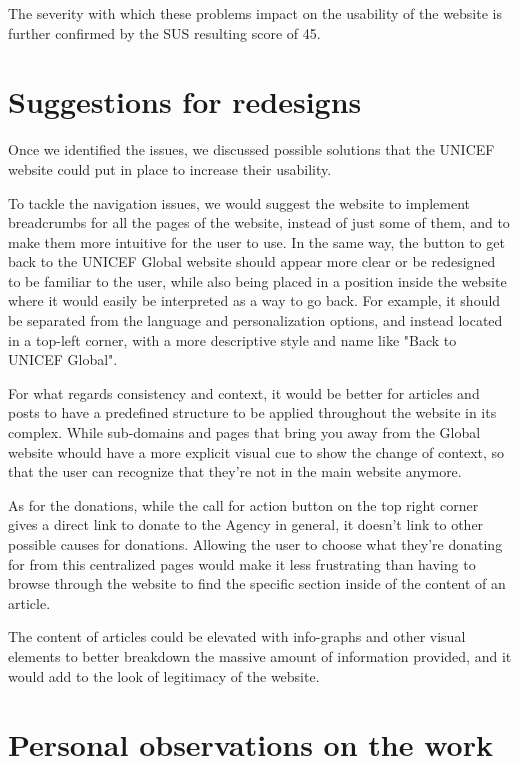 The severity with which these problems impact on the usability of the website is further confirmed by the SUS resulting score of 45.

\section{Suggestions for redesigns}
Once we identified the issues, we discussed possible solutions that the UNICEF website could put in place to increase their usability.

To tackle the navigation issues, we would suggest the website to implement breadcrumbs for all the pages of the website, instead of just some of them, and to make them more intuitive for the user to use. In the same way, the button to get back to the UNICEF Global website should appear more clear or 
be redesigned to be familiar to the user, while also being placed in a position inside the website where it would easily be interpreted as a way to go back. For example, it should be separated from the language and personalization options, and instead located in a top-left corner, with a more descriptive style and name like "Back to UNICEF Global".

For what regards consistency and context, it would be better for articles and posts to have a predefined structure to be applied throughout the website in its complex. While sub-domains and pages that bring you away from the Global website whould have a more explicit visual cue to show the change of context, so that the user can recognize that they're not in the main website anymore.

As for the donations, while the call for action button on the top right corner gives a direct link to donate to the Agency in general, it doesn't link to other possible causes for donations. Allowing the user to choose what they're donating for from this centralized pages would make it less frustrating than having to browse through the website to find the specific section inside of the content of an article.

The content of articles could be elevated with info-graphs and other visual elements to better breakdown the massive amount of information provided, and it would add to the look of legitimacy of the website.

\section{Personal observations on the work}
